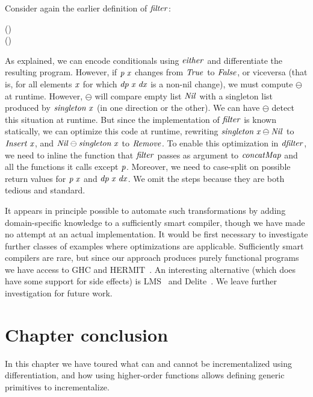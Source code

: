Consider again the earlier definition of \ensuremath{\Varid{filter}}:
\begin{hscode}\SaveRestoreHook
{}%
%
\>[B]{}\mathrel{:\mkern-1mu:}(\to {})\to {}\;\to {}\;\<[E]%
\\
\>[B]{}\;\mathrel{=}\;(\lambda {}\to {}\;\;\;\;\;\;\;){}\<[E]%
\ColumnHook
\end{hscode}\resethooks
As explained, we can encode conditionals using \ensuremath{\Varid{either}} and differentiate the
resulting program. However, if \ensuremath{\Varid{p}\;\Varid{x}} changes from \ensuremath{\Conid{True}} to \ensuremath{\Conid{False}}, or
viceversa (that is, for all elements \ensuremath{\Varid{x}} for which \ensuremath{\Varid{dp}\;\Varid{x}\;\Varid{dx}} is a non-nil
change), we must compute \ensuremath{\ominus } at runtime. However, \ensuremath{\ominus } will compare
empty list \ensuremath{\Conid{Nil}} with a singleton list produced by \ensuremath{\Varid{singleton}\;\Varid{x}} (in one
direction or the other). We can have \ensuremath{\ominus } detect this situation at
runtime. But since the implementation of \ensuremath{\Varid{filter}} is known statically, we can
optimize this code at runtime, rewriting \ensuremath{\Varid{singleton}\;\Varid{x}\ominus \Conid{Nil}} to \ensuremath{\Conid{Insert}\;\Varid{x}}, and \ensuremath{\Conid{Nil}\ominus \Varid{singleton}\;\Varid{x}} to \ensuremath{\Conid{Remove}}. To enable this optimization in
\ensuremath{\Varid{dfilter}}, we need to inline the function that \ensuremath{\Varid{filter}} passes as argument to
\ensuremath{\Varid{concatMap}} and all the functions it calls except \ensuremath{\Varid{p}}. Moreover, we need to
case-split on possible return values for \ensuremath{\Varid{p}\;\Varid{x}} and \ensuremath{\Varid{dp}\;\Varid{x}\;\Varid{dx}}. We omit the steps
because they are both tedious and standard.

It appears in principle possible to automate such transformations by adding
domain-specific knowledge to a sufficiently smart compiler, though we have made
no attempt at an actual implementation. It would be first necessary to
investigate further classes of examples where optimizations are
applicable.
Sufficiently smart compilers are rare, but since our approach produces purely
functional programs we have access to GHC and HERMIT~\citep{Farmer2012hermit}.
An interesting alternative (which does have some support for side effects) is
LMS~\citep{rompf2010lightweight} and Delite~\citep{Brown11}.
We leave further investigation for future work.

\section{Chapter conclusion}
In this chapter we have toured what can and cannot be incrementalized using
differentiation, and how using higher-order functions allows defining generic
primitives to incrementalize.
